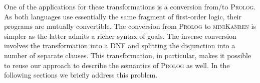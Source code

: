 \begin{comment}
The overall result is not literally the same as what we've shown in Section~\ref{language}, but denotationally equivalent.

The conversion in the opposite direction involves the following steps:

\begin{itemize}
  \item converting between term representation;
  \item moving all ``\lstinline|fresh|'' constructs into the top-level;
  \item transforming the freshless body into DNF;
  \item replacing all unifications with calls for a specific predicate ``\lstinline|unify/2|'', defined as

\begin{lstlisting}
   unify (X, X).
\end{lstlisting}    

  \item splitting the top-level disjunctions into separate clauses with the same head.
\end{itemize}

The correctness of these, again, can be justified denotationally. For the append$^o$ relation in Section~\ref{language} the result
will be as follows:

\begin{lstlisting}
  append (X, Y, Z) :- unify (X, []), unify (Z, Y).
  append (X, Y, Z) :-
    unify (X, [H$|$T]),
    unify (Z, [H$|$TY]),
    append (T, Y, TY).
\end{lstlisting}

\end{comment}

One of the applications for these transformations is a conversion from/to \textsc{Prolog}. As both languages use essentially the same fragment of first-order logic,
their programs are mutually convertible. The conversion from \textsc{Prolog} to \textsc{miniKanren} is simpler as the latter admits a richer syntax of goals. The inverse
conversion involves the transformation into a DNF and splitting the disjunction into a number of separate clauses. This transformation, in particular, makes it possible to
reuse our approach to describe the semantics of \textsc{Prolog} as well. In the following sections we briefly address this problem.

\begin{comment}
We can use these substantiated transformations, for example, to convert an arbitrary \textsc{miniKanren} specification into a form analogous to specifications in \textsc{Prolog}.
With this conversion we can not only interpret \textsc{Prolog} specifications in interleaving semantics, but we also can, using the certified framework we developed, describe conventional \textsc{Prolog} search strategies.
\end{comment}

